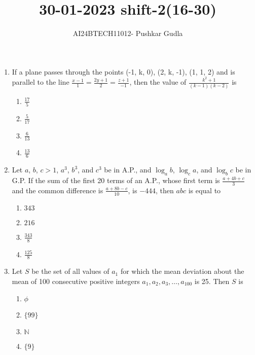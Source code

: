 \documentclass[journal,12pt,onecolumn]{IEEEtran}
\theoremstyle{remark}
\begin{document}

\vspace{3cm}

\title{\textbf{30-01-2023 shift-2(16-30)}}
\author{AI24BTECH11012- Pushkar Gudla}
\maketitle
\bigskip

\renewcommand{\thefigure}{\theenumi}
\renewcommand{\thetable}{\theenumi}
\setlength{\columnsep}{2.5em}

\begin{enumerate}
    \item If a plane passes through the points (-1, k, 0), (2, k, -1), (1, 1, 2) and is parallel to the line $\frac{x-1}{1} = \frac{2y+1}{2} = \frac{z+1}{-1}$, then the value of $\frac{k^2+1}{(k-1)(k-2)}$ is
    \begin{enumerate}
        \item $\frac{17}{5}$
        \item $\frac{5}{17}$
        \item $\frac{6}{13}$
        \item $\frac{13}{6}$
    \end{enumerate}
    
    \item Let $a$, $b$, $c > 1$, $a^3$, $b^3$, and $c^3$ be in A.P., and $\log_ab$, $\log_ca$, and $\log_bc$ be in G.P. If the sum of the first 20 terms of an A.P., whose first term is $\frac{a+4b+c}{3}$ and the common difference is $\frac{a+8b-c}{10}$, is $-444$, then $abc$ is equal to
    \begin{enumerate}
        \item $343$
        \item $216$
        \item $\frac{343}{8}$
        \item $\frac{125}{8}$
    \end{enumerate}

    \item Let $S$ be the set of all values of $a_1$ for which the mean deviation about the mean of 100 consecutive positive integers $a_1, a_2, a_3, \dots, a_{100}$ is 25. Then $S$ is
    \begin{enumerate}
        \item $\phi$
        \item $\{99\}$
        \item $\mathbb{N}$
        \item $\{9\}$
    \end{enumerate}


\end{enumerate}
\end{document}

